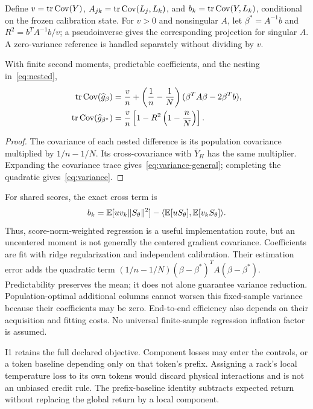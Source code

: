 Define $v=\operatorname{tr}\operatorname{Cov}(Y)$, $A_{jk}=\operatorname{tr}\operatorname{Cov}(L_j,L_k)$, and $b_k=\operatorname{tr}\operatorname{Cov}(Y,L_k)$, conditional on the frozen calibration state. For $v>0$ and nonsingular $A$, let $\beta^*=A^{-1}b$ and $R^2=b^TA^{-1}b/v$; a pseudoinverse gives the corresponding projection for singular $A$. A zero-variance reference is handled separately without dividing by $v$.
\begin{proposition}
With finite second moments, predictable coefficients, and the nesting in~\eqref{eq:nested},
\begin{align}
\operatorname{tr}\operatorname{Cov}(\widehat g_\beta)
 &=\frac{v}{n}+\left(\frac1n-\frac1N\right)
    (\beta^TA\beta-2\beta^Tb),\label{eq:variance-general}\\
\operatorname{tr}\operatorname{Cov}(\widehat g_{\beta^*})
 &=\frac{v}{n}\left[1-R^2\left(1-\frac nN\right)\right].
\label{eq:variance}
\end{align}
\end{proposition}
\begin{proof}
The covariance of each nested difference is its population covariance multiplied by $1/n-1/N$. Its cross-covariance with $\overline Y_H$ has the same multiplier. Expanding the covariance trace gives~\eqref{eq:variance-general}; completing the quadratic gives~\eqref{eq:variance}.
\end{proof}

For shared scores, the exact cross term is
\begin{equation}
b_k=\mathbb{E}[u v_k\|S_\theta\|^2]-\langle\mathbb{E}[uS_\theta],\mathbb{E}[v_kS_\theta]\rangle.
\end{equation}
Thus, score-norm-weighted regression is a useful implementation route, but an uncentered moment is not generally the centered gradient covariance. Coefficients are fit with ridge regularization and independent calibration. Their estimation error adds the quadratic term $(1/n-1/N)(\beta-\beta^*)^TA(\beta-\beta^*)$. Predictability preserves the mean; it does not alone guarantee variance reduction. Population-optimal additional columns cannot worsen this fixed-sample variance because their coefficients may be zero. End-to-end efficiency also depends on their acquisition and fitting costs. No universal finite-sample regression inflation factor is assumed.

I1 retains the full declared objective. Component losses may enter the controls, or a token baseline depending only on that token's prefix. Assigning a rack's local temperature loss to its own tokens would discard physical interactions and is not an unbiased credit rule. The prefix-baseline identity subtracts expected return without replacing the global return by a local component.

